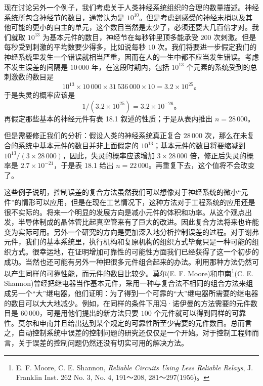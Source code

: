 现在讨论另外一个例子，我们考虑关于人类神经系统组织的合理的数量描述。神经系统所包含神经节的数目，通常认为是 $10^{10}$。但是考虑到感受的神经末梢以及其他可能的更小的自主的单元，这个数目当然是太少了，必须还要大几百倍才对。我们就取 $10^{13}$ 为基本元件的数目，神经节在每秒钟里顶多能承受 $200$ 次刺激。但是每秒受到刺激的平均数要少得多，比如说每秒 $10$ 次。我们将要进一步假定我们的神经系统里发生一个错误就相当严重，因而在人的一生中都不应当发生错误。考虑不发生误差的间隔是 $10\,000$ 年，在这段时期内，包括 $10^{13}$ 个元素的系统受到的总刺激数的数目是
\begin{equation*}
10^{13} \times 10\,000 \times 31\,536\,000 \times 10 = 3.2\times 10^{25}。
\end{equation*}
于是失灵的概率应该是
\[
1/(3.2\times 10^{25}) = 3.2\times 10^{-26}。
\]
再假定那些基本的神经元件有表 18.1 叙述的性质；于是从表内推出 $n=28\,000$。

但是需要修正我们的分析：假设人类的神经系统真正复合 $28\,000$ 次，那么在未复合的系统中基本元件的数目并非上面假定的 $10^{13}$；基本元件的数目将要缩减到 $10^{13}/(3\times28\,000)$，因此，失灵的概率应该增加 $3\times28\,000$ 倍，修正后失灵的概率是 $2.7\times10^{-21}$，于是表 18.1 给出 $n=22\,000$。再重复下去，这个值将不会改变了。

这些例子说明，控制误差的复合方法虽然我们可以想像对于神经系统的微小“元件”的情形可以应用，但是在现在工艺情况下，这种方法对于工程系统的应用还是很不实际的。将来一个明显的发展方向是减小元件的体积和功率。从这个观点出发，半导体制成的晶体管比起真空管来有了巨大的改进。因此复合方法将来也许能变为实际可用。另外一个研究的方向是更加深入地分析控制误差的过程。对于谢弗元件，我们的基本系统里，执行机构和复原机构的组织方式毕竟只是一种可能的组织方式。很幸运地，在证明增加可靠性的可能性方面我们已经获得了这一个初步的成功。当然也还可能有另外一种把很多元件组合起来的办法。利用那种方法仍然可以产生同样的可靠性能，而元件的数目比较少。莫尔(E. F. Moore)和申南\footnote{E. F. Moore, C. E. Shannon, \textit{Reliable Circuits Using Less Reliable Relays}, J. Franklin Inst. 262 No. 3, No. 4, 191～208, 281～297(1956)。}(C. E. Shannon)曾经把继电器当作基本元件，采用一种与复合法不相同的组合方法来组成另一个“大”继电器，他们证明：为了得到一个可靠的“大”继电器所需要的继电器的数目可以大大地减少。例如，在同样的条件下用冯·诺伊曼的方法需要的元件数目是 $60\,000$，可是用他们提出的新方法只要 $100$ 个元件就可以得到同样的可靠性。莫尔和申南并且给出达到某个规定的可靠性所至少需要的元件数目。总而言之，自动控制系统中误差的控制问题的研究还仅仅是一个开始。对于控制工程师而言，关于误差的控制问题仍然还没有切实可用的解决方法。
